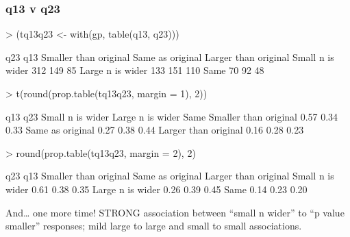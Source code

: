 \documentclass[11pt]{article}
\begin{document}
\subsubsection{q13 v q23}
\label{sec-1-4-1}
\begin{Schunk}
\begin{Sinput}
> (tq13q23 <- with(gp, table(q13, q23)))
\end{Sinput}
\begin{Soutput}
                  q23
q13                Smaller than original Same as original Larger than original
  Small n is wider                   312              149                   85
  Large n is wider                   133              151                  110
  Same                                70               92                   48
\end{Soutput}
\begin{Sinput}
> t(round(prop.table(tq13q23, margin = 1), 2))
\end{Sinput}
\begin{Soutput}
                       q13
q23                     Small n is wider Large n is wider Same
  Smaller than original             0.57             0.34 0.33
  Same as original                  0.27             0.38 0.44
  Larger than original              0.16             0.28 0.23
\end{Soutput}
\begin{Sinput}
> round(prop.table(tq13q23, margin = 2), 2)
\end{Sinput}
\begin{Soutput}
                  q23
q13                Smaller than original Same as original Larger than original
  Small n is wider                  0.61             0.38                 0.35
  Large n is wider                  0.26             0.39                 0.45
  Same                              0.14             0.23                 0.20
\end{Soutput}
\end{Schunk}





And\ldots{} one more time! STRONG association between ``small n wider'' to ``p value smaller'' responses; mild large to large and small to small associations.
\end{document}
